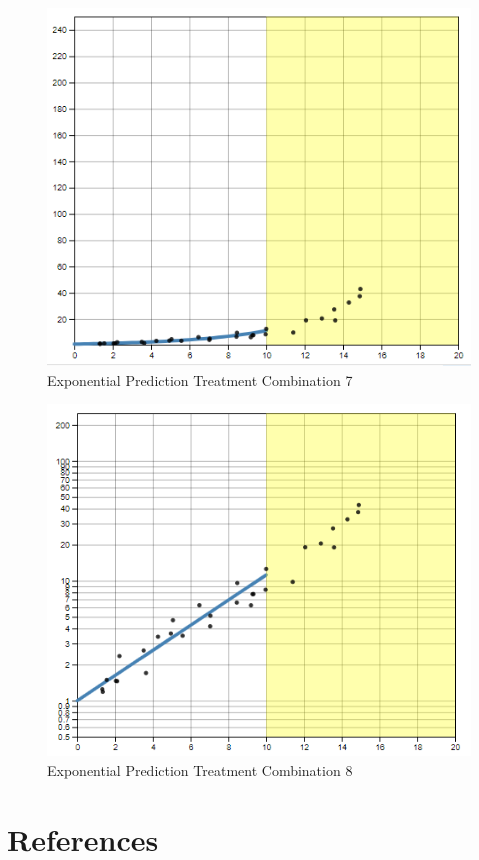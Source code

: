 \documentclass[print]{nuthesis}
\begin{document}
\begin{figure}[tbp]

{\centering \includegraphics[width=0.75\linewidth,]{images/high-15-linear} 

}

\caption{Exponential Prediction Treatment Combination 7}\label{fig:high-15-linear}
\end{figure}

\begin{figure}[tbp]

{\centering \includegraphics[width=0.75\linewidth,]{images/high-15-log} 

}

\caption{Exponential Prediction Treatment Combination 8}\label{fig:high-15-log}
\end{figure}

\backmatter

\hypertarget{references}{%
\chapter*{References}\label{references}}
\end{document}
